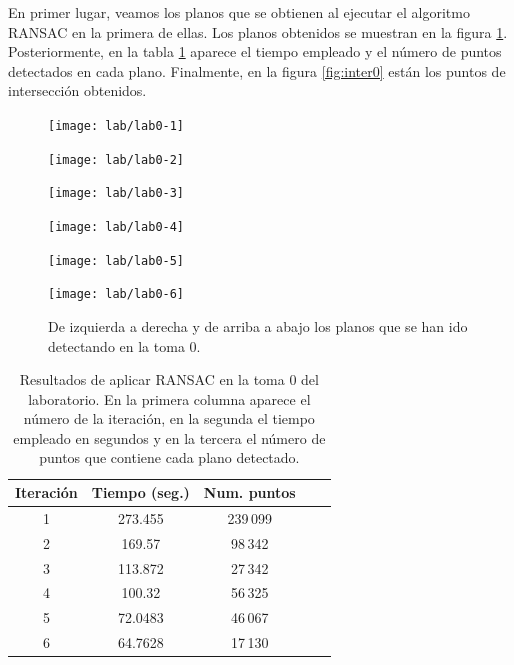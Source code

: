 En primer lugar, veamos los planos que se obtienen al ejecutar el algoritmo RANSAC en la primera de ellas. Los planos obtenidos se muestran en la figura \ref{fig:planos-lab0}. Posteriormente, en la tabla \ref{table:res-lab0} aparece el tiempo empleado y el número de puntos detectados en cada plano. Finalmente, en la figura \ref{fig:inter0} están los puntos de intersección obtenidos. \\

\begin{figure}[h!]
	\centering
	\begin{minipage}{0.4\textwidth}
		\centering
		\texttt{[image: lab/lab0-1]} 
	\end{minipage}
	\centering
	\begin{minipage}{0.4\textwidth}
		\centering
		\texttt{[image: lab/lab0-2]} 
	\end{minipage}
	\begin{minipage}{0.4\textwidth}
		\centering
		\texttt{[image: lab/lab0-3]} 
	\end{minipage}
	\centering
	\begin{minipage}{0.4\textwidth}
		\centering
		\texttt{[image: lab/lab0-4]} 
	\end{minipage}
	\begin{minipage}{0.4\textwidth}
		\centering
		\texttt{[image: lab/lab0-5]} 
	\end{minipage}
	\centering
	\begin{minipage}{0.4\textwidth}
		\centering
		\texttt{[image: lab/lab0-6]} 
	\end{minipage}
	\caption{De izquierda a derecha y de arriba a abajo los planos que se han ido detectando en la toma 0.}
	\label{fig:planos-lab0}
\end{figure}

\begin{table}[h!]
	\centering
	\begin{tabular}{| c | c | c | c | c |} 
		\hline
		Iteración  & Tiempo (seg.) & Num. puntos \\
		\hline
		1 & 273.455 & 239\,099 \\				  
		2 & 169.57  & 98\,342  \\	
		3 & 113.872 &  27\,342 \\
		4 & 100.32 &   56\,325\\
		5 & 72.0483 & 46\,067 \\
		6 & 64.7628 & 17\,130 \\
		\hline
	\end{tabular}
	\caption{Resultados de aplicar RANSAC en la toma 0 del laboratorio. En la primera columna aparece el número de la iteración, en la segunda el tiempo empleado en segundos y en la tercera el número de puntos que contiene cada plano detectado.}
	\label{table:res-lab0}
\end{table}

